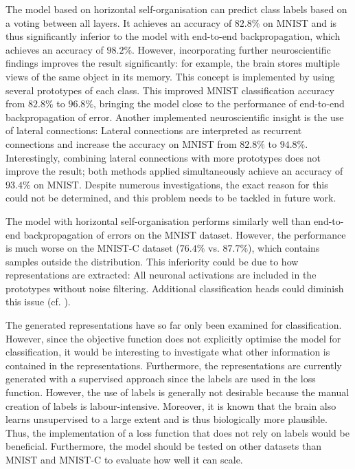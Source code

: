 The model based on horizontal self-organisation can predict class labels based on a voting between all layers.
It achieves an accuracy of $82.8\%$ on MNIST and is thus significantly inferior to the model with end-to-end backpropagation, which achieves an accuracy of $98.2\%$. However, incorporating further neuroscientific findings improves the result significantly: for example, the brain stores multiple views of the same object in its memory. This concept is implemented by using several prototypes of each class. This improved MNIST classification accuracy from $82.8\%$ to $96.8\%$, bringing the model close to the performance of end-to-end backpropagation of error. Another implemented neuroscientific insight is the use of lateral connections: Lateral connections are interpreted as recurrent connections and increase the accuracy on MNIST from $82.8\%$ to $94.8\%$. Interestingly, combining lateral connections with more prototypes does not improve the result; both methods applied simultaneously achieve an accuracy of $93.4\%$ on MNIST. Despite numerous investigations, the exact reason for this could not be determined, and this problem needs to be tackled in future work.

The model with horizontal self-organisation performs similarly well than end-to-end backpropagation of errors on the MNIST dataset. However, the performance is much worse on the MNIST-C dataset ($76.4\%$ vs. $87.7\%$), which contains samples outside the distribution. This inferiority could be due to how representations are extracted: All neuronal activations are included in the prototypes without noise filtering. Additional classification heads could diminish this issue (cf. ). 

The generated representations have so far only been examined for classification. However, since the objective function does not explicitly optimise the model for classification, it would be interesting to investigate what other information is contained in the representations. Furthermore, the representations are currently generated with a supervised approach since the labels are used in the loss function. However, the use of labels is generally not desirable because the manual creation of labels is labour-intensive. Moreover, it is known that the brain also learns unsupervised to a large extent and is thus biologically more plausible.
Thus, the implementation of a loss function that does not rely on labels would be beneficial. Furthermore, the model should be tested on other datasets than MNIST and MNIST-C to evaluate how well it can scale.

